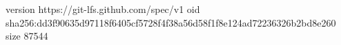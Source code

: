 version https://git-lfs.github.com/spec/v1
oid sha256:dd3f90635d97118f6405cf5728f4f38a56d58f1f8e124ad72236326b2bd8e260
size 87544
